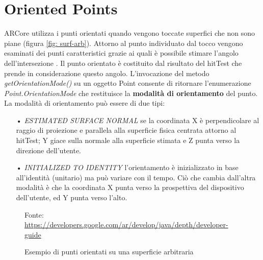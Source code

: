 \documentclass[crop=false, class=book]{standalone}
\begin{document}
		
	\chapter{Oriented Points}
	
		ARCore utilizza i punti orientati quando vengono toccate superfici che non sono piane (figura \vref{fig: surf-arb}). 			Attorno al punto individuato dal tocco vengono esaminati dei punti caratteristici grazie ai quali è 							possibile stimare l'angolo dell'intersezione \cite{anna2018arcoredetection}. Il punto orientato è costituito dal 				risultato del hitTest che prende in considerazione questo angolo. 
		L'invocazione del metodo \emph{getOrientationMode()} su un oggetto Point consente di ritornare l'enumerazione 					\emph{Point.OrientationMode} che restituisce la \textbf{modalità di orientamento} del punto.\\
		La modalità di orientamento può essere di due tipi:
		\begin{itemize}
			\item[•] \emph{ESTIMATED SURFACE NORMAL} se la coordinata X è perpendicolare al raggio di proiezione e parallela alla superficie fisica centrata attorno al hitTest; Y giace sulla normale alla superficie stimata e Z punta verso la direzione dell'utente.
			\item[•] \emph{INITIALIZED TO IDENTITY} l'orientamento è inizializzato in base all'identità (unitario) ma può variare con il tempo. Ciò che cambia dall'altra modalità è che la coordinata X punta verso la prospettiva del dispositivo dell'utente, ed Y punta verso l'alto.
		\end{itemize}
		
				
		\begin{figure}
				\centering
				{Fonte: \url{https://developers.google.com/ar/develop/java/depth/developer-guide}}
				\caption{Esempio di punti orientati su una superficie arbitraria}
				\label{fig: surf-arb}
		\end{figure}
		
		
\end{document}
